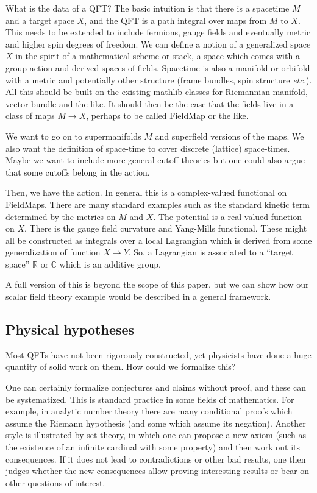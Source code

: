 \documentclass{article}
\newcommand{\1}{\mathbbm{1}}
\theoremstyle{plain}
\theoremstyle{definition}
\numberwithin{equation}{section}
\def\IC{\mathbb{C}}
\def\IR{\mathbb{R}}
\begin{document}
What is the data of a QFT?  The basic intuition is that there is a spacetime $M$ and a target space $X$, and the QFT is a path integral
over maps from $M$ to $X$.  This needs to be extended to include fermions, gauge fields and eventually metric and higher spin degrees of freedom.
We can define a notion of a generalized space $X$ in the spirit of a mathematical scheme or stack, a space which comes with a group action
and derived spaces of fields.  Spacetime is also a manifold or orbifold with a metric and potentially other structure (frame bundles, spin structure {\it etc.}).
All this should be built on the existing mathlib classes for Riemannian manifold, vector bundle and the like.
It should then be the case that the fields live in a class of maps $M\rightarrow X$, perhaps to be called FieldMap or the like.

We want to go on to supermanifolds $M$ and superfield versions of the maps.  We also want the definition of space-time to cover
discrete (lattice) space-times.  Maybe we want to include more general cutoff theories but one could also argue that some cutoffs belong in the action.

Then, we have the action.  In general this is a complex-valued functional on FieldMaps.  There are many standard examples such as the
standard kinetic term determined by the metrics on $M$ and $X$.  The potential is a real-valued function on $X$.  There is the gauge field curvature
and Yang-Mills functional.  These might all be constructed as integrals over a local Lagrangian which is derived from some generalization of function $X\rightarrow Y$.
So, a Lagrangian is associated to a ``target space'' $\IR$ or $\IC$ which is an additive group.

A full version of this is beyond the scope of this paper, but we can show how our scalar field theory example would be described in a general framework.

\subsection{Physical hypotheses}

Most QFTs have not been rigorously constructed, yet physicists have done a huge quantity of solid work on them.  How could we formalize this?

One can certainly formalize conjectures and claims without proof, and these can be systematized.  
This is standard practice in some fields of mathematics.  For example, in analytic number theory there are many conditional proofs which
assume the Riemann hypothesis (and some which assume its negation).  Another style is illustrated by set theory, 
in which one can propose a new axiom (such as the existence of an infinite cardinal with some property) and then work out its
consequences.  If it does not lead to contradictions or other bad results, one then judges whether the new consequences allow
proving interesting results or bear on other questions of interest. 
\end{document}
